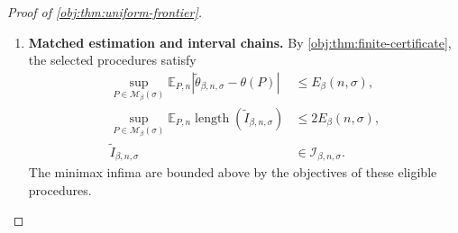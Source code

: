 \begin{proof}[Proof of \cref{obj:thm:uniform-frontier}]
\begin{enumerate}
Define the dilation multiplier by
\[
\alpha_{\mathrm{dil}}=\frac{h_{\mathrm{up}}}{h_\star(n,\sigma)}.
\]
The width bounds imply
\[
(D_{\mathrm{env}}+1)^2\le\alpha_{\mathrm{dil}}\le A_{\mathrm{dil}},
\qquad
\alpha_{\mathrm{dil}}\ge1,
\qquad
\alpha_{\mathrm{dil}}h_\star(n,\sigma)=h_{\mathrm{up}}\le1.
\]
Thus \cref{obj:lem:noise-cost-scaling} applies and gives
\[
1+\Psi(h_{\mathrm{up}},\sigma)
\le\max\left\{
1,\,
\alpha_{\mathrm{dil}}^{-1/2}
[1+\Psi(h_\star(n,\sigma),\sigma)]
\right\}.
\]
Because \(D_{\mathrm{env}}/\sqrt{\alpha_{\mathrm{dil}}}\le1\), multiplication by
\(D_{\mathrm{env}}\) gives
\[
\begin{aligned}
D_{\mathrm{env}}[1+\Psi(h_{\mathrm{up}},\sigma)]
&\le
\max\left\{
D_{\mathrm{env}},\,
1+\Psi(h_\star(n,\sigma),\sigma)
\right\}\\
&\le D_{\mathrm{env}}+1+\Psi(h_\star(n,\sigma),\sigma).
\end{aligned}
\]
Hence
\[
V_{L_{\mathrm{up}}}(\sigma)
\le D_{\mathrm{env}}L_{\mathrm{up}}^2
 e^{D_{\mathrm{env}}+1}
 \exp\{\Psi(h_\star(n,\sigma),\sigma)\}.
\]
The rounding bound also gives
\[
L_{\mathrm{up}}^2
\le\frac4{A_{\mathrm{dil}}h_\star(n,\sigma)}
\le\frac4{h_\star(n,\sigma)}.
\]
Using the root balance and \(\nu=2\beta+1\), we obtain
\[
\frac{40V_{L_{\mathrm{up}}}(\sigma)}n
\le160D_{\mathrm{env}}e^{D_{\mathrm{env}}+1}
 h_\star(n,\sigma)^{2\beta},
\]
and therefore
\[
\sqrt{\frac{40V_{L_{\mathrm{up}}}(\sigma)}n}
\le Q_{\mathrm{var}}h_\star(n,\sigma)^\beta.
\]
The bias bound gives
\[
M_{L_{\mathrm{up}},\beta}
\le K_{\mathrm{bias}}h_{\mathrm{up}}^\beta
\le K_{\mathrm{bias}}A_{\mathrm{dil}}^\beta
 h_\star(n,\sigma)^\beta.
\]
Since \(L_{\mathrm{up}}\) is an eligible candidate,
\[
\begin{aligned}
E_\beta(n,\sigma)
&\le\rho_{L_{\mathrm{up}}}\\
&\le
(12K_{\mathrm{bias}}A_{\mathrm{dil}}^\beta+28Q_{\mathrm{var}})
 h_\star(n,\sigma)^\beta\\
&\le C_{\mathrm{up}}r_\beta(n,\sigma).
\end{aligned}
\]
Both cases establish this comparison over the full parameter range.

\item \textbf{Matched estimation and interval chains.}
By \cref{obj:thm:finite-certificate}, the selected procedures satisfy
\[
\begin{aligned}
\sup_{P\in\mathcal M_\beta(\sigma)}
\mathbb E_{P,n}
|\widetilde\theta_{\beta,n,\sigma}-\theta(P)|
&\le E_\beta(n,\sigma),\\
\sup_{P\in\mathcal M_\beta(\sigma)}
\mathbb E_{P,n}\operatorname{length}(\widetilde I_{\beta,n,\sigma})
&\le2E_\beta(n,\sigma),\\
\widetilde I_{\beta,n,\sigma}&\in\mathcal I_{\beta,n,\sigma}.
\end{aligned}
\]
The minimax infima are bounded above by the objectives of these eligible procedures.


\end{enumerate}
\end{proof}
